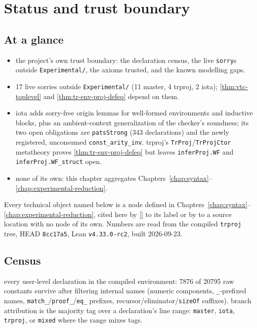 \chapter{Status and trust boundary}
\label{chap:status}

\section*{At a glance}
\begin{itemize}
\item {} the project's own trust boundary: the declaration census, the live \texttt{sorry}s outside \texttt{Experimental/}, the axioms trusted, and the known modelling gaps.
\item {} \stSorry{} 17 live sorries outside \texttt{Experimental/} (11 master, 4 trproj, 2 iota); \stTainted{} \ref{thm:vtc-toplevel} and \ref{thm:tr-env-proj-defeq} depend on them.
\item {} iota adds sorry-free origin lemmas for well-formed environments and inductive blocks, plus an ambient-context generalization of the checker's soundness; its two open obligations are \texttt{patsStrong} (343 declarations) and the newly registered, unconsumed \texttt{const\_arity\_inv}. trproj's \texttt{TrProj}/\texttt{TrProjCtor} metatheory proves \ref{thm:tr-env-proj-defeq} but leaves \texttt{inferProj.WF} and \texttt{inferProj.WF\_struct} open.
\item {} none of its own: this chapter aggregates Chapters~\ref{chap:syntax}--\ref{chap:experimental-reduction}.
\end{itemize}

Every technical object named below is a node defined in Chapters~\ref{chap:syntax}--\ref{chap:experimental-reduction}, cited here by \ref{} to its label or by \srcloc{}{} to a source location with no node of its own. Numbers are read from the compiled \texttt{trproj} tree, HEAD \texttt{8cc17a5}, Lean \texttt{v4.33.0-rc2}, built 2026-09-23.

\section{Census}
\label{status:sec:census}

 every user-level declaration in the compiled environment: 7876 of 20795 raw constants survive after filtering internal names (numeric components, \texttt{\_}-prefixed names, \texttt{match\_}/\texttt{proof\_}/\texttt{eq\_} prefixes, recursor/eliminator/\texttt{sizeOf} suffixes).  branch attribution is the majority tag over a declaration's line range: \texttt{master}, \texttt{iota}, \texttt{trproj}, or \texttt{mixed} where the range mixes tags.

